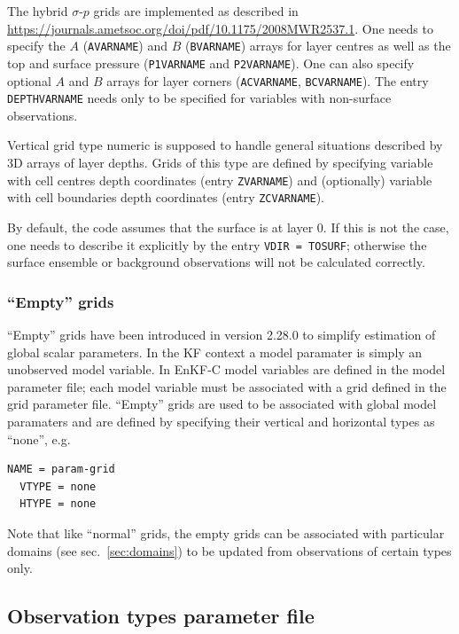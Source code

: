 \documentclass[11pt]{report}
\begin{document}
The hybrid $\sigma$-$p$ grids are implemented as described in \url{https://journals.ametsoc.org/doi/pdf/10.1175/2008MWR2537.1}.
One needs to specify the $A$ (\verb|AVARNAME|) and $B$ (\verb|BVARNAME|) arrays for layer centres as well as the top and surface pressure (\verb|P1VARNAME| and \verb|P2VARNAME|).
One can also specify optional $A$ and $B$ arrays for layer corners (\verb|ACVARNAME|, \verb|BCVARNAME|).
The entry \verb|DEPTHVARNAME| needs only to be specified for variables with non-surface observations.

Vertical grid type numeric is supposed to handle general situations described by 3D arrays of layer depths.
Grids of this type are defined by specifying variable with cell centres depth coordinates (entry \verb|ZVARNAME|) and (optionally) variable with cell boundaries depth coordinates (entry \verb|ZCVARNAME|).

By default, the code assumes that the surface is at layer 0.
If this is not the case, one needs to describe it explicitly by the entry \verb|VDIR = TOSURF|; otherwise the surface ensemble or background observations will not be calculated correctly.

\subsubsection{``Empty'' grids}

``Empty'' grids have been introduced in version 2.28.0 to simplify estimation of global scalar parameters.
In the KF context a model paramater is simply an unobserved model variable.
In EnKF-C model variables are defined in the model parameter file; each model variable must be associated with a grid defined in the grid parameter file.
``Empty'' grids are used to be associated with global model paramaters and are defined by specifying their vertical and horizontal types as ``none'', e.g.
\begin{Verbatim}[frame=single,fontsize=\footnotesize]
  NAME = param-grid
  VTYPE = none
  HTYPE = none
\end{Verbatim}
Note that like ``normal'' grids, the empty grids can be associated with particular domains (see sec.~\ref{sec:domains}) to be updated from observations of certain types only.

\subsection{Observation types parameter file}
\label{sec:obstypesprm}
\end{document}
